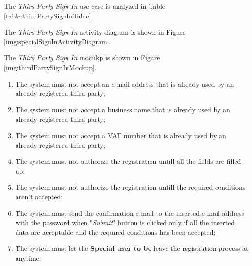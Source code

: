 The \textit{Third Party Sign In} use case is analyzed in Table \ref{table:thirdPartySignInTable}.

The \textit{Third Party Sign In} activity diagram is shown in Figure \ref{img:specialSignInActivityDiagram}.

The \textit{Third Party Sign In} mocukp is shown in Figure \ref{img:thirdPartySignInMockup}.

\begin{enumerate}
  \item The system must not accept an e-mail address that is already used by an already registered third party;
  \item The system must not accept a business name that is already used by an already registered third party;
  \item The system must not accept a VAT number that is already used by an already registered third party;
  \item The system must not authorize the registration untill all the fields are filled up;
  \item The system must not authorize the registration untill the required conditions aren't accepted;
  \item The system must send the confirmation e-mail to the inserted e-mail address with the password when "\textit{Submit}" button is clicked only if all the inserted data are acceptable and the required conditions has been accepted;
  \item The system must let the \textbf{Special user to be} leave the registration process at anytime.
\end{enumerate}

